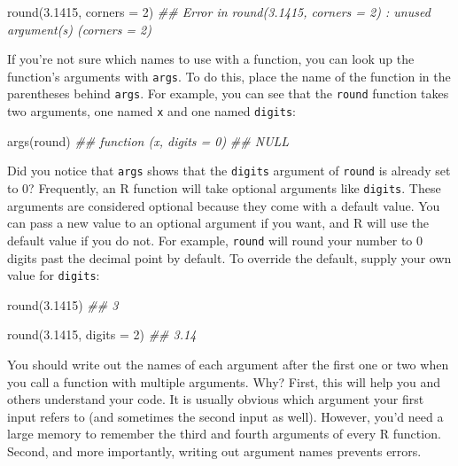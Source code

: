 \documentclass[
  letterpaper,
  DIV=11,
  numbers=noendperiod]{scrbook}
\newenvironment{Shaded}{\begin{snugshade}}{\end{snugshade}}
\newcommand{\AttributeTok}[1]{\textcolor[rgb]{0.40,0.45,0.13}{#1}}
\newcommand{\DecValTok}[1]{\textcolor[rgb]{0.68,0.00,0.00}{#1}}
\newcommand{\DocumentationTok}[1]{\textcolor[rgb]{0.37,0.37,0.37}{\textit{#1}}}
\newcommand{\FloatTok}[1]{\textcolor[rgb]{0.68,0.00,0.00}{#1}}
\newcommand{\FunctionTok}[1]{\textcolor[rgb]{0.28,0.35,0.67}{#1}}
\newcommand{\NormalTok}[1]{\textcolor[rgb]{0.00,0.23,0.31}{#1}}
\begin{document}
\begin{Shaded}
\begin{Highlighting}[]
\FunctionTok{round}\NormalTok{(}\FloatTok{3.1415}\NormalTok{, }\AttributeTok{corners =} \DecValTok{2}\NormalTok{)}
\DocumentationTok{\#\# Error in round(3.1415, corners = 2) : unused argument(s) (corners = 2)}
\end{Highlighting}
\end{Shaded}

If you're not sure which names to use with a function, you can look up
the function's arguments with \texttt{args}. To do this, place the name
of the function in the parentheses behind \texttt{args}. For example,
you can see that the \texttt{round} function takes two arguments, one
named \texttt{x} and one named \texttt{digits}:

\begin{Shaded}
\begin{Highlighting}[]
\FunctionTok{args}\NormalTok{(round)}
\DocumentationTok{\#\# function (x, digits = 0) }
\DocumentationTok{\#\# NULL}
\end{Highlighting}
\end{Shaded}

Did you notice that \texttt{args} shows that the \texttt{digits}
argument of \texttt{round} is already set to 0? Frequently, an R
function will take optional arguments like \texttt{digits}. These
arguments are considered optional because they come with a default
value. You can pass a new value to an optional argument if you want, and
R will use the default value if you do not. For example, \texttt{round}
will round your number to 0 digits past the decimal point by default. To
override the default, supply your own value for \texttt{digits}:

\begin{Shaded}
\begin{Highlighting}[]
\FunctionTok{round}\NormalTok{(}\FloatTok{3.1415}\NormalTok{)}
\DocumentationTok{\#\# 3}

\FunctionTok{round}\NormalTok{(}\FloatTok{3.1415}\NormalTok{, }\AttributeTok{digits =} \DecValTok{2}\NormalTok{)}
\DocumentationTok{\#\# 3.14}
\end{Highlighting}
\end{Shaded}

You should write out the names of each argument after the first one or
two when you call a function with multiple arguments. Why? First, this
will help you and others understand your code. It is usually obvious
which argument your first input refers to (and sometimes the second
input as well). However, you'd need a large memory to remember the third
and fourth arguments of every R function. Second, and more importantly,
writing out argument names prevents errors.
\end{document}
